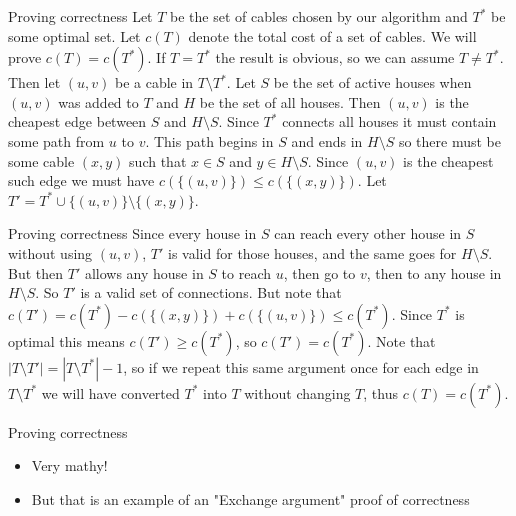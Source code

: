 \documentclass{beamer}
\begin{document}
\begin{frame}[plain]{Proving correctness}
    Let $T$ be the set of cables chosen by our algorithm and $T^*$ be some optimal set.
    Let $c(T)$ denote the total cost of a set of cables. We will prove $c(T) = c(T^*)$.
    If $T = T^*$ the result is obvious, so we can assume $T \neq T^*$.
    Then let $(u, v)$ be a cable in $T \setminus T^*$. Let $S$ be the set of active houses
    when $(u, v)$ was added to $T$ and $H$ be the set of all houses. Then $(u, v)$ is the cheapest
    edge between $S$ and $H \setminus S$. Since $T^*$ connects all houses it must contain some
    path from $u$ to $v$. This path begins in $S$ and ends in $H \setminus S$ so there must be some
    cable $(x, y)$ such that $x \in S$ and $y \in H \setminus S$. Since $(u, v)$ is the cheapest such
    edge we must have $c(\{(u, v)\}) \leq c(\{(x, y)\})$. Let $T' = T^* \cup \{(u, v)\} \setminus \{(x, y)\}$.
\end{frame}

\begin{frame}[plain]{Proving correctness}
    Since every house in $S$ can reach every other house in $S$ without using $(u, v)$, $T'$ is valid for
    those houses, and the same goes for $H \setminus S$. But then $T'$ allows any house in $S$ to reach
    $u$, then go to $v$, then to any house in $H \setminus S$. So $T'$ is a valid set of connections. But note
    that $c(T') = c(T^*)  - c(\{(x, y)\}) + c(\{(u, v)\}) \leq c(T^*)$. Since $T^*$ is optimal this means
    $c(T') \geq c(T^*)$, so $c(T') = c(T^*)$. Note that $|T \setminus T'| = |T \setminus T^*| - 1$, so if
    we repeat this same argument once for each edge in $T \setminus T^*$ we will have converted
    $T^*$ into $T$ without changing $T$, thus $c(T) = c(T^*)$.
\end{frame}

\begin{frame}[plain]{Proving correctness}
    \begin{itemize}
        \item Very mathy!
        \item But that is an example of an "Exchange argument" proof of correctness
    \end{itemize}
\end{frame}
\end{document}
